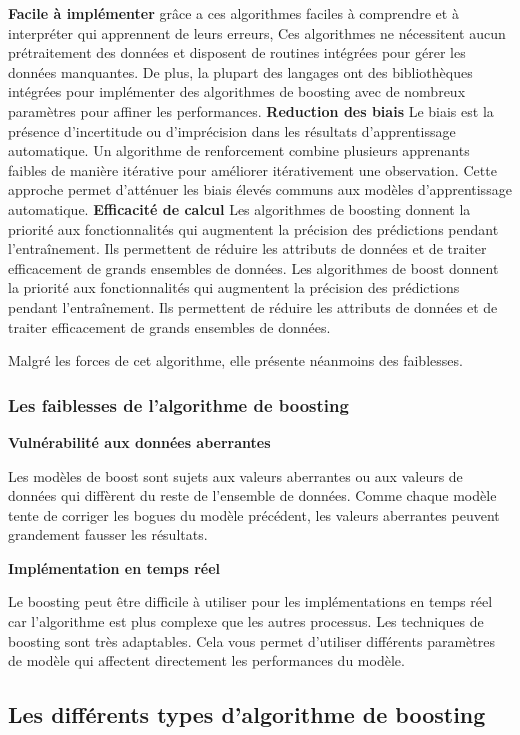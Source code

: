 \documentclass[french,a4paper,12pt]{article}
\begin{document}
\textbf{ Facile à implémenter }
\quad  grâce a ces algorithmes faciles à comprendre et à interpréter qui apprennent de leurs erreurs, Ces algorithmes ne nécessitent aucun prétraitement des données et disposent de routines intégrées pour gérer les données manquantes. De plus, la plupart des langages ont des bibliothèques intégrées pour implémenter des algorithmes de boosting avec de nombreux paramètres pour affiner les performances.
\textbf{Reduction des biais }
\quad Le biais est la présence d'incertitude ou d'imprécision dans les résultats d'apprentissage automatique. Un algorithme de renforcement combine plusieurs apprenants faibles de manière itérative pour améliorer itérativement une observation. Cette approche permet d'atténuer les biais élevés communs aux modèles d'apprentissage automatique.
\textbf{Efficacité de calcul }
\quad Les algorithmes de boosting donnent la priorité aux fonctionnalités qui augmentent la précision des prédictions pendant l'entraînement. Ils permettent de réduire les attributs de données et de traiter efficacement de grands ensembles de données. Les algorithmes de boost donnent la priorité aux fonctionnalités qui augmentent la précision des prédictions pendant l'entraînement. Ils permettent de réduire les attributs de données et de traiter efficacement de grands ensembles de données.

\quad Malgré les forces de cet algorithme, elle présente néanmoins des faiblesses. 


\subsubsection{Les faiblesses de l'algorithme de boosting}

\textbf{Vulnérabilité aux données aberrantes }

\quad Les modèles de boost sont sujets aux valeurs aberrantes ou aux valeurs de données qui diffèrent du reste de l'ensemble de données. Comme chaque modèle tente de corriger les bogues du modèle précédent, les valeurs aberrantes peuvent grandement fausser les résultats.


\textbf{Implémentation en temps réel}

\quad Le boosting peut être difficile à utiliser pour les implémentations en temps réel car l'algorithme est plus complexe que les autres processus. Les techniques de boosting sont très adaptables. Cela vous permet d'utiliser différents paramètres de modèle qui affectent directement les performances du modèle.

\subsection{ Les différents types d'algorithme de boosting}
\end{document}
